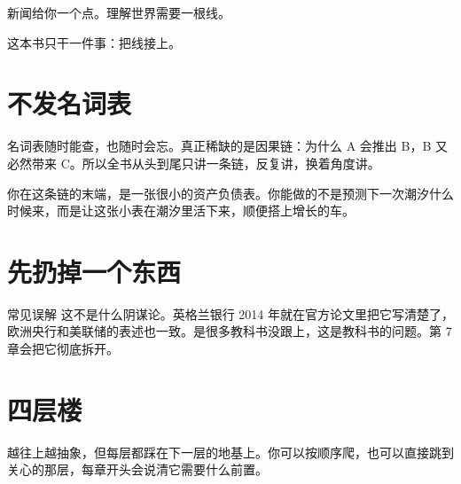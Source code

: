 新闻给你一个点。理解世界需要一根线。

这本书只干一件事：把线接上。

\section{不发名词表}

名词表随时能查，也随时会忘。真正稀缺的是因果链：为什么 A 会推出 B，B 又必然带来 C。所以全书从头到尾只讲一条链，反复讲，换着角度讲。

\begin{chainflow}
\chainarrow {}\chainarrow {}\chainarrow {}\chainarrow {}\chainarrow {}\chainarrow {}\chainarrow {}\chainarrow {}\chainarrow {}\chainarrow {}\chainarrow {}
\end{chainflow}

你在这条链的末端，是一张很小的资产负债表。你能做的不是预测下一次潮汐什么时候来，而是让这张小表在潮汐里活下来，顺便搭上增长的车。

\section{先扔掉一个东西}

\begin{mythbox}{常见误解}
这不是什么阴谋论。英格兰银行 2014 年就在官方论文里把它写清楚了，欧洲央行和美联储的表述也一致。是很多教科书没跟上，这是教科书的问题。第 7 章会把它彻底拆开。

\end{mythbox}

\section{四层楼}

越往上越抽象，但每层都踩在下一层的地基上。你可以按顺序爬，也可以直接跳到关心的那层，每章开头会说清它需要什么前置。

